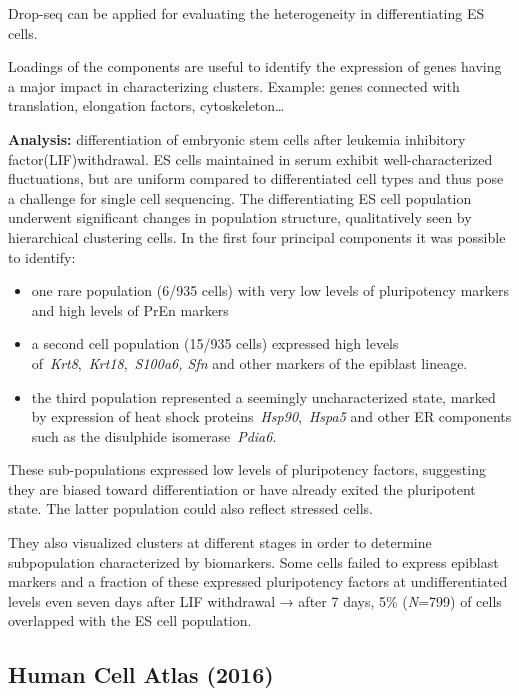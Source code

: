Drop-seq can be applied for evaluating the heterogeneity in
differentiating ES cells.

Loadings of the components are useful to identify the expression of
genes having a major impact in characterizing clusters. Example: genes
connected with translation, elongation factors, cytoskeleton\ldots{}

\textbf{Analysis:} differentiation of embryonic stem cells after
leukemia inhibitory factor(LIF)withdrawal. ES cells maintained in serum
exhibit well-characterized fluctuations, but are uniform compared to
differentiated cell types and thus pose a challenge for single cell
sequencing. The differentiating ES cell population underwent significant
changes in population structure, qualitatively seen by hierarchical
clustering cells. In the first four principal components it was possible
to identify:

\begin{itemize}
\tightlist
\item
  one rare population (6/935 cells) with very low levels of pluripotency
  markers and high levels of PrEn markers
\item
  a second cell population (15/935 cells) expressed high levels
  of~\emph{Krt8},~\emph{Krt18},~\emph{S100a6, Sfn} and other markers of
  the epiblast lineage.
\item
  the third population represented a seemingly uncharacterized state,
  marked by expression of heat shock proteins~\emph{Hsp90},~\emph{Hspa5}
  and other ER components such as the disulphide isomerase~\emph{Pdia6}.
\end{itemize}

These sub-populations expressed low levels of pluripotency factors,
suggesting they are biased toward differentiation or have already exited
the pluripotent state. The latter population could also reflect stressed
cells.

They also visualized clusters at different stages in order to determine
subpopulation characterized by biomarkers. Some cells failed to express
epiblast markers and a fraction of these expressed pluripotency factors
at undifferentiated levels even seven days after LIF withdrawal → after
7 days, 5\% (\emph{N}=799) of cells overlapped with the ES cell
population.

\hypertarget{human-cell-atlas-2016}{%
\subsection{Human Cell Atlas (2016)}\label{human-cell-atlas-2016}}

